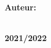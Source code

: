 \begin{titlepage}
\begin{center}
\begin{doublespacing}
        {\Large\textbf{Auteur:}\\}
       {\Large\textbf{\AuthorName}\\}
       \vspace{2.5 mm}
       

     
     \vspace{8 mm}
        
     {\large\textbf{2021/2022}}
    
    \end{doublespacing}

   \end{center}
\end{titlepage}
